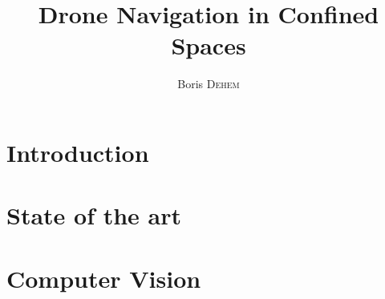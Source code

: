 \documentclass{eplmastersthesis}
\title{Drone Navigation in Confined Spaces}
\author{Boris \textsc{Dehem}}
\begin{document}






\tableofcontents

\printglossaries
\newpage
{}
\chapter{Introduction} %


\chapter{State of the art} %


\chapter{Computer Vision} %


%
\end{document}
